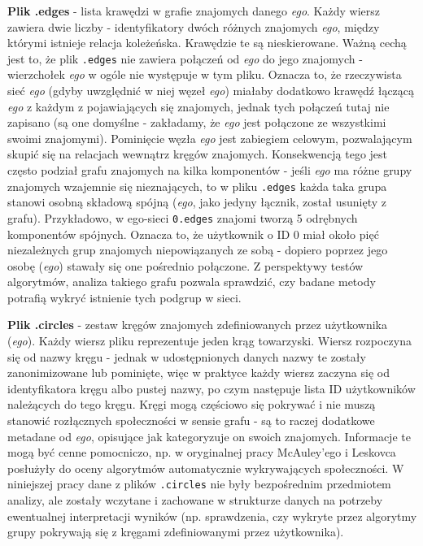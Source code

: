 \textbf{Plik .edges} - lista krawędzi w grafie znajomych danego \textit{ego}. Każdy wiersz zawiera dwie liczby - identyfikatory dwóch różnych znajomych \textit{ego}, między którymi istnieje relacja koleżeńska. Krawędzie te są nieskierowane. Ważną cechą jest to, że plik \verb|.edges| nie zawiera połączeń od \textit{ego} do jego znajomych - wierzchołek \textit{ego} w ogóle nie występuje w tym pliku. Oznacza to, że rzeczywista sieć \textit{ego} (gdyby uwzględnić w niej węzeł \textit{ego}) miałaby dodatkowo krawędź łączącą \textit{ego} z każdym z pojawiających się znajomych, jednak tych połączeń tutaj nie zapisano (są one domyślne - zakładamy, że \textit{ego} jest połączone ze wszystkimi swoimi znajomymi). Pominięcie węzła \textit{ego} jest zabiegiem celowym, pozwalającym skupić się na relacjach wewnątrz kręgów znajomych. Konsekwencją tego jest często podział grafu znajomych na kilka komponentów - jeśli \textit{ego} ma różne grupy znajomych wzajemnie się nieznających, to w pliku \verb|.edges| każda taka grupa stanowi osobną składową spójną (\textit{ego}, jako jedyny łącznik, został usunięty z grafu). Przykładowo, w ego-sieci \verb|0.edges| znajomi tworzą 5 odrębnych komponentów spójnych. Oznacza to, że użytkownik o ID 0 miał około pięć niezależnych grup znajomych niepowiązanych ze sobą - dopiero poprzez jego osobę (\textit{ego}) stawały się one pośrednio połączone. Z perspektywy testów algorytmów, analiza takiego grafu pozwala sprawdzić, czy badane metody potrafią wykryć istnienie tych podgrup w sieci.

\textbf{Plik .circles} - zestaw kręgów znajomych zdefiniowanych przez użytkownika (\textit{ego}). Każdy wiersz pliku reprezentuje jeden krąg towarzyski. Wiersz rozpoczyna się od nazwy kręgu - jednak w udostępnionych danych nazwy te zostały zanonimizowane lub pominięte, więc w praktyce każdy wiersz zaczyna się od identyfikatora kręgu albo pustej nazwy, po czym następuje lista ID użytkowników należących do tego kręgu. Kręgi mogą częściowo się pokrywać i nie muszą stanowić rozłącznych społeczności w sensie grafu - są to raczej dodatkowe metadane od \textit{ego}, opisujące jak kategoryzuje on swoich znajomych. Informacje te mogą być cenne pomocniczo, np. w oryginalnej pracy McAuley'ego i Leskovca posłużyły do oceny algorytmów automatycznie wykrywających społeczności. W niniejszej pracy dane z plików \verb|.circles| nie były bezpośrednim przedmiotem analizy, ale zostały wczytane i zachowane w strukturze danych na potrzeby ewentualnej interpretacji wyników (np. sprawdzenia, czy wykryte przez algorytmy grupy pokrywają się z kręgami zdefiniowanymi przez użytkownika).

